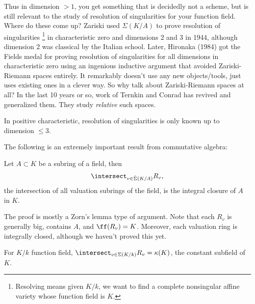 \begin{remark}

Thus in dimension \(>1\), you get something that is decidedly not a
scheme, but is still relevant to the study of resolution of
singularities for your function field. Where do these come up? Zariski
used \(\Sigma(K/A)\) to prove resolution of singularities \footnote{Resolving
  means given \(K/k\), we want to find a complete nonsingular affine
  variety whose function field is \(K\).} in characteristic zero and
dimensions 2 and 3 in 1944, although dimension 2 was classical by the
Italian school. Later, Hironaka (1984) got the Fields medal for proving
resolution of singularities for all dimensions in characteristic zero
using an ingenious inductive argument that avoided Zariski-Riemann
spaces entirely. It remarkably doesn't use any new objects/tools, just
uses existing ones in a clever way. So why talk about Zariski-Riemann
spaces at all? In the last 10 years or so, work of Ternkin and Conrad
has revived and generalized them. They study \emph{relative} such
spaces.

\end{remark}

\begin{problem}[Open]

In positive characteristic, resolution of singularities is only known up
to dimension \(\leq 3\).

\end{problem}

The following is an extremely important result from commutative algebra:

\begin{theorem}[CA 17.17]

Let \(A \subset K\) be a subring of a field, then
\begin{align*}  
\intersect_{v\in \tilde \Sigma(K/A)} R_v
,\end{align*} the intersection of all valuation subrings of the field,
is the integral closure of \(A\) in \(K\).

\end{theorem}

The proof is mostly a Zorn's lemma type of argument. Note that each
\(R_v\) is generally big, contains \(A\), and \(\ff(R_v) = K\).
Moreover, each valuation ring is integrally closed, although we haven't
proved this yet.

\begin{corollary}[?]

For \(K/k\) function field,
\(\intersect_{v\in \Sigma(K/k)} R_v = \kappa(K)\), the constant subfield
of \(K\).

\end{corollary}

